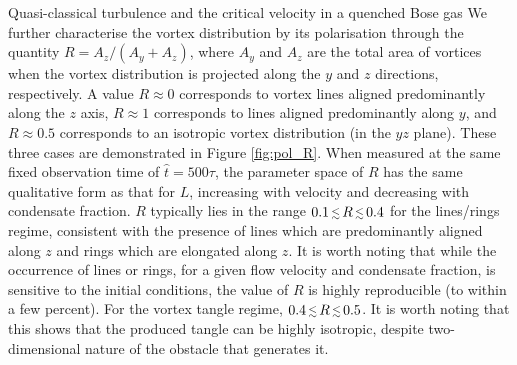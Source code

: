 \begin{chapter}{\label{cha:nonequib}Quasi-classical turbulence and the critical velocity in a quenched Bose gas}
We further characterise the vortex distribution by its polarisation through the quantity $R=A_z/(A_y+A_z)$, where $A_y$ and $A_z$ are the total area of vortices when the vortex distribution is projected along the $y$ and $z$ directions, respectively.  A value $R \approx 0$ corresponds to vortex lines aligned predominantly along the $z$ axis, $R\approx 1$ corresponds to lines aligned predominantly along $y$, and $R\approx 0.5$ corresponds to an isotropic vortex distribution (in the $yz$ plane). These three cases are demonstrated in Figure \ref{fig:pol_R}.  When measured at the same fixed observation time of $\hat{t}=500\tau$, the parameter space of $R$ has the same qualitative form as that for $L$, increasing with velocity and decreasing with condensate fraction. $R$ typically lies in the range $0.1 \,\mbox{\footnotesize$\lesssim$}\, R\,\mbox{\footnotesize$\lesssim$}\, 0.4$ for the lines/rings regime, consistent with the presence of lines which are predominantly aligned along $z$ and rings which are elongated along $z$.  It is worth noting that while the occurrence of lines or rings, for a given flow velocity and condensate fraction, is sensitive to the initial conditions, the value of $R$ is highly reproducible (to within a few percent). For the vortex tangle regime, $0.4 \,\mbox{\footnotesize$\lesssim$}\, R\,\mbox{\footnotesize$\lesssim$}\, 0.5$.  It is worth noting that this shows that the produced tangle can be highly isotropic, despite two-dimensional nature of the obstacle that generates it.
\begin{figure}
\centering%
~%
%
\end{figure}
\end{chapter}
